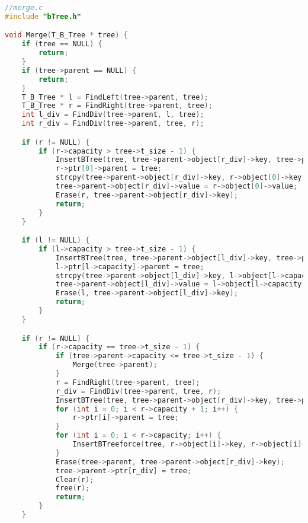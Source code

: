 \begin{lstlisting}[language=C]
//merge.c
#include "bTree.h"

void Merge(T_B_Tree * tree) {
    if (tree == NULL) {
        return;
    }
    if (tree->parent == NULL) {
        return;
    }
    T_B_Tree * l = FindLeft(tree->parent, tree);
    T_B_Tree * r = FindRight(tree->parent, tree);
    int l_div = FindDiv(tree->parent, l, tree);
    int r_div = FindDiv(tree->parent, tree, r);

    if (r != NULL) {
        if (r->capacity > tree->t_size - 1) {
            InsertBTree(tree, tree->parent->object[r_div]->key, tree->parent->object[r_div]->value, NULL, r->ptr[0]);
            r->ptr[0]->parent = tree;
            strcpy(tree->parent->object[r_div]->key, r->object[0]->key);
            tree->parent->object[r_div]->value = r->object[0]->value;
            Erase(r, tree->parent->object[r_div]->key);
            return;
        }
    }

    if (l != NULL) {
        if (l->capacity > tree->t_size - 1) {
            InsertBTree(tree, tree->parent->object[l_div]->key, tree->parent->object[l_div]->value, l->ptr[l->capacity], NULL);
            l->ptr[l->capacity]->parent = tree;
            strcpy(tree->parent->object[l_div]->key, l->object[l->capacity - 1]->key);
            tree->parent->object[l_div]->value = l->object[l->capacity - 1]->value;
            Erase(l, tree->parent->object[l_div]->key);
            return;
        }
    }

    if (r != NULL) {
        if (r->capacity == tree->t_size - 1) {
            if (tree->parent->capacity <= tree->t_size - 1) {
                Merge(tree->parent);
            }
            r = FindRight(tree->parent, tree);
            r_div = FindDiv(tree->parent, tree, r);
            InsertBTree(tree, tree->parent->object[r_div]->key, tree->parent->object[r_div]->value, NULL, NULL);
            for (int i = 0; i < r->capacity + 1; i++) {
                r->ptr[i]->parent = tree;
            }
            for (int i = 0; i < r->capacity; i++) {
                InsertBTreeforce(tree, r->object[i]->key, r->object[i]->value, r->ptr[i], r->ptr[i + 1]);
            }
            Erase(tree->parent, tree->parent->object[r_div]->key);
            tree->parent->ptr[r_div] = tree;
            Clear(r);
            free(r);
            return;
        }
    }


\end{lstlisting}
